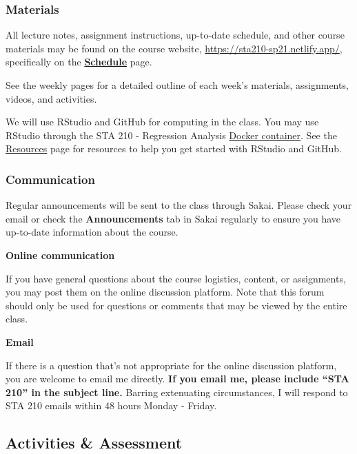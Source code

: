 \documentclass[
]{article}
\begin{document}
\hypertarget{materials}{%
\subsubsection{Materials}\label{materials}}

All lecture notes, assignment instructions, up-to-date schedule, and
other course materials may be found on the course website,
\url{https://sta210-sp21.netlify.app/}, specifically on the
\href{https://sta210-sp21.netlify.app/schedule/}{\textbf{Schedule}}
page.

See the weekly pages for a detailed outline of each week's materials,
assignments, videos, and activities.

We will use RStudio and GitHub for computing in the class. You may use
RStudio through the STA 210 - Regression Analysis
\href{https://vm-manage.oit.duke.edu/containers}{Docker container}. See
the \href{/resources/}{Resources} page for resources to help you get
started with RStudio and GitHub.

\hypertarget{communication}{%
\subsubsection{Communication}\label{communication}}

Regular announcements will be sent to the class through Sakai. Please
check your email or check the \textbf{Announcements} tab in Sakai
regularly to ensure you have up-to-date information about the course.

\textbf{Online communication}

If you have general questions about the course logistics, content, or
assignments, you may post them on the online discussion platform. Note
that this forum should only be used for questions or comments that may
be viewed by the entire class.

\textbf{Email}

If there is a question that's not appropriate for the online discussion
platform, you are welcome to email me directly. \textbf{If you email me,
please include ``STA 210'' in the subject line.} Barring extenuating
circumstances, I will respond to STA 210 emails within 48 hours Monday -
Friday.

\hypertarget{activities-assessment}{%
\subsection{Activities \& Assessment}\label{activities-assessment}}
\end{document}
